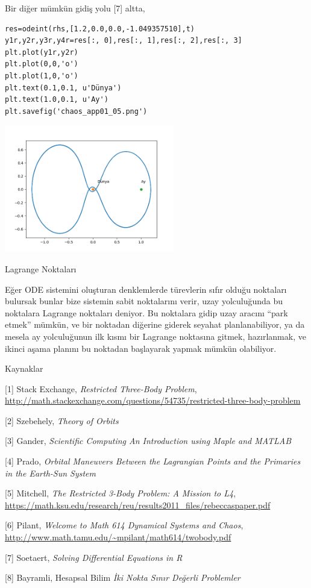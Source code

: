 \documentclass[12pt,fleqn]{article}\usepackage{../../common}
\begin{document}
Bir diğer mümkün gidiş yolu [7] altta,

\begin{verbatim}
res=odeint(rhs,[1.2,0.0,0.0,-1.049357510],t)
y1r,y2r,y3r,y4r=res[:, 0],res[:, 1],res[:, 2],res[:, 3]
plt.plot(y1r,y2r)
plt.plot(0,0,'o')
plt.plot(1,0,'o')
plt.text(0.1,0.1, u'Dünya')
plt.text(1.0,0.1, u'Ay')
plt.savefig('chaos_app01_05.png')
\end{verbatim}

\includegraphics[width=20em]{chaos_app01_05.png}

Lagrange Noktaları 

Eğer ODE sistemini oluşturan denklemlerde türevlerin sıfır olduğu noktaları
bulursak bunlar bize sistemin sabit noktalarını verir, uzay yolculuğunda bu
noktalara Lagrange noktaları deniyor. Bu noktalara gidip uzay aracını
``park etmek'' mümkün, ve bir noktadan diğerine giderek seyahat
planlanabiliyor, ya da mesela ay yolculuğunun ilk kısmı bir Lagrange
noktasına gitmek, hazırlanmak, ve ikinci aşama planını bu noktadan
başlayarak yapmak mümkün olabiliyor.

Kaynaklar

[1] Stack Exchange, {\em Restricted Three-Body Problem}, \url{http://math.stackexchange.com/questions/54735/restricted-three-body-problem}

[2] Szebehely, {\em Theory of Orbits}

[3] Gander, {\em Scientific Computing An Introduction using Maple and MATLAB}

[4] Prado, {\em Orbital Maneuvers Between the Lagrangian Points and the Primaries in the Earth-Sun System}

[5] Mitchell, {\em The Restricted 3-Body Problem: A Mission to L4}, \url{https://math.ksu.edu/research/reu/results2011_files/rebeccaspaper.pdf}

[6] Pilant, {\em Welcome to Math 614  Dynamical Systems and Chaos}, \url{http://www.math.tamu.edu/~mpilant/math614/twobody.pdf}

[7] Soetaert, {\em Solving Differential Equations in R}

[8] Bayramli, Hesapsal Bilim {\em İki Nokta  Sınır Değerli Problemler}
\end{document}
